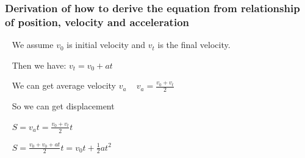 \documentclass[12pt]{article}
\begin{document}
	\subsubsection*{Derivation of how to derive the equation from relationship of position, velocity and acceleration}
	
	~\newline
	We assume $v_{0}$ is initial velocity and $v_{t}$ is the final velocity. 
	
	~\newline
	Then we have:
	$v_{t}=v_{0}+at$
	
	~\newline
	We can get average velocity $v_{a}$
	~\newline
	$v_{a}=\frac{v_{0}+v_{t}}{2}$
	
	~\newline
	So we can get displacement
	
	~\newline 
	$S=v_{a}t=\frac{v_{0}+v_{t}}{2}t$
	
	~\newline
	$S=\frac{v_{0}+v_{0}+at}{2}t=v_{0}t+\frac{1}{2}at^{2}$
	
	
	~\newline
	
\end{document}
